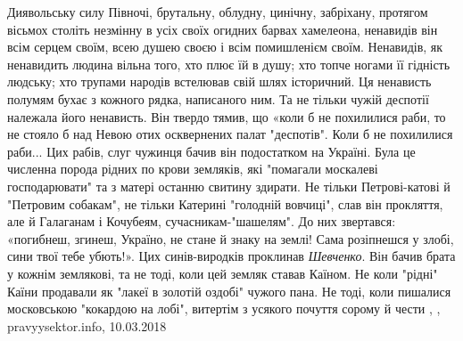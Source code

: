  
 
 
 
 


Диявольську силу Півночі, брутальну, облудну, цинічну, забріхану, протягом
вісьмох століть незмінну в усіх своїх огидних барвах хамелеона, ненавидів він
всім серцем своїм, всею душею своєю і всім помишленієм своїм. Ненавидів, як
ненавидить людина вільна того, хто плює їй в душу; хто топче ногами її гідність
людську; хто трупами народів встелював свій шлях історичний. Ця ненависть
полумям бухає з кожного рядка, написаного ним. Та не тільки чужій деспотії
належала його ненависть.  Він твердо тямив, що «коли б не похилилися раби, то
не стояло б над Невою отих осквернених палат "деспотів". Коли б не похилилися
раби... Цих рабів, слуг чужинця бачив він подостатком на Україні. Була це
численна порода рідних по крови земляків, які "помагали москалеві
господарювати" та з матері останню свитину здирати. Не тільки Петрові-катові й
"Петровим собакам", не тільки Катерині "голодній вовчиці", слав він прокляття,
але й Галаганам і Кочубеям, сучасникам-"шашелям". До них звертався: «погибнеш,
згинеш, Україно, не стане й знаку на землі! Сама розіпнешся у злобі, сини твої
тебе убють!». Цих синів-виродків проклинав \emph{Шевченко}. Він бачив брата у кожнім
землякові, та не тоді, коли цей земляк ставав Каїном. Не коли "рідні" Каїни
продавали як "лакеї в золотій оздобі" чужого пана. Не тоді, коли пишалися
московською "кокардою на лобі", витертім з усякого почуття сорому й чести
, , pravyysektor.info, 10.03.2018

